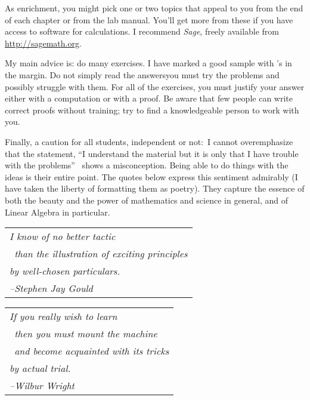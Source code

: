 {As enrichment, you might pick one or two topics that appeal to you 
from the end of each chapter or from the lab manual.
You'll get more from these
if you have access to software for calculations.
I recommend \textit{Sage}, freely available 
from \url{http://sagemath.org}.

My main advice is: do many exercises.
I have marked a good sample with \recommendationmark's in the margin.
Do not simply read the answers\Dash you must
try the problems and possibly struggle with them.
For all of the exercises, you must justify your answer either with a computation
or with a proof.
Be aware that few people can write correct proofs without training;
try to find a knowledgeable person to work with you.

Finally, a caution for all students, independent or not:~I 
cannot overemphasize that the 
statement, ``I understand the material but it is only 
that I have trouble with the problems''\ %
shows a misconception.
Being able to do things with the ideas is their entire point.
The quotes below express this sentiment admirably
(I have taken the liberty of formatting them as poetry).
They capture the essence of both the beauty and the power
of mathematics and science in general, 
and of Linear Algebra in particular.

\bigskip
\par\noindent\begin{tabular}[t]{@{}l@{}}
  \textit{I know of no better tactic}                     \\
  \textit{\ than the illustration of exciting principles} \\
  \textit{by well-chosen particulars.}                    \\
  \hspace*{1in}\textit{--Stephen Jay Gould}
\end{tabular}

\bigskip
\par\noindent
\begin{tabular}[t]{@{}l@{}}   
\textit{If you really wish to learn}                     \\
   \textit{\ then you must mount the machine}  \\ 
   \textit{\ and become acquainted with its tricks} \\
   \textit{by actual trial.}                    \\
   \hspace*{1in}\textit{--Wilbur Wright}
\end{tabular}

}
